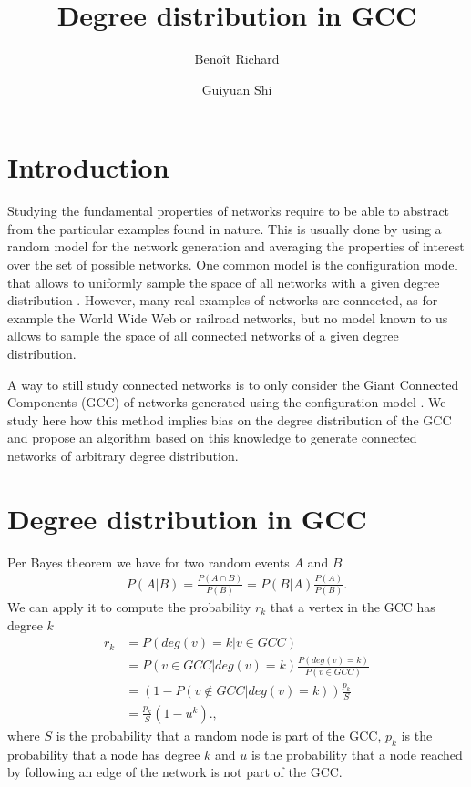 \documentclass[a4paper]{article}
\title{Degree distribution in GCC}
\author{Benoît Richard \and Guiyuan Shi}
\begin{document}
\listoftodos

\maketitle


\section{Introduction}

Studying the fundamental properties of networks require to be able to abstract from the particular examples found in nature. This is usually done \missingref by using a random model for the network generation and averaging the properties of interest over the set of possible networks. One common model is the configuration model \missingref that allows to uniformly sample the space of all networks with a given degree distribution \missingref. However, many real examples of networks are connected, as for example the World Wide Web or railroad networks, but no model known to us allows to sample the space of all connected networks of a given degree distribution.

A way to still study connected networks is to only consider the Giant Connected Components (GCC) of networks generated using the configuration model \missingref. We study here how this method implies bias on the degree distribution of the GCC and propose an algorithm based on this knowledge to generate connected networks of arbitrary degree distribution.

\section{Degree distribution in GCC}

Per Bayes theorem we have for two random events $A$ and $B$
\begin{align}
	P(A | B) = \frac{P(A \cap B)}{ P(B)} = P(B | A) \frac{P(A)}{P(B)}. \label{Bayes theorem}
\end{align}
We can apply it to compute the probability $r_k$ that a vertex in the GCC has degree $k$
\begin{align}
	r_k &= P(deg(v) = k | v \in GCC)\\
	&= P(v \in GCC | deg(v) = k) \frac{P(deg(v) = k)}{P(v \in GCC)} \\
	&= (1 - P(v \notin GCC|deg(v) = k)) \frac{p_k}{S} \\
	&= \frac{p_k}{S} (1 - u^k). \label{Degree distribution in GCC},
\end{align}
where $S$ is the probability that a random node is part of the GCC, $p_k$ is the probability that a node has degree $k$ and $u$ is the probability that a node reached by following an edge of the network is not part of the GCC. 
\end{document}
